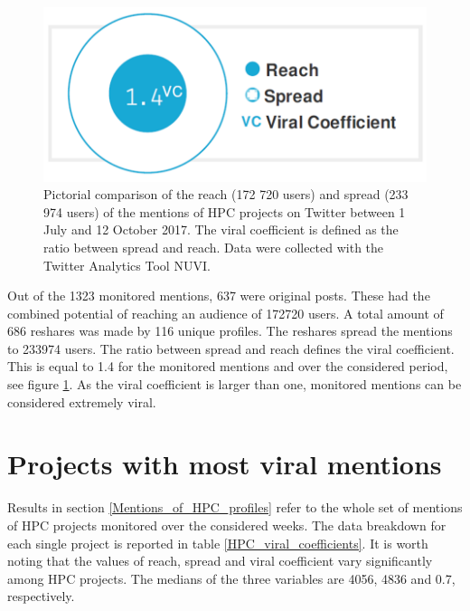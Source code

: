 \begin{figure}[!t] 
 \begin{center}
 \includegraphics[scale=0.2]{Images/HPC_viral_coefficient.png}
 \caption{Pictorial comparison of the reach (172 720 users) and spread (233 974 users) of the mentions of HPC projects on Twitter between 1 July and 12 October 2017. The viral coefficient is defined as the ratio between spread and reach. Data were collected with the Twitter Analytics Tool NUVI.}
 \label{HPC_viral_coefficient}
 \end{center}
\end{figure}

Out of the 1323 monitored mentions, 637 were original posts. These had the combined potential of reaching an audience of 172720 users. A total amount of 686 reshares was made by 116 unique profiles. The reshares spread the mentions to 233974 users. The ratio between spread and reach defines the viral coefficient. This is equal to 1.4 for the monitored mentions and over the considered period, see figure \ref{HPC_viral_coefficient}. As the viral coefficient is larger than one, monitored mentions can be considered extremely viral. 

\section{Projects with most viral mentions} \label{Projects_with_most_viral_mentions}
Results in section \ref{Mentions_of_HPC_profiles} refer to the whole set of mentions of HPC projects monitored over the considered weeks. The data breakdown for each single project is reported in table \ref{HPC_viral_coefficients}. It is worth noting that the values of reach, spread and viral coefficient vary significantly among HPC projects. The medians of the three variables are 4056, 4836 and 0.7, respectively.     
 
